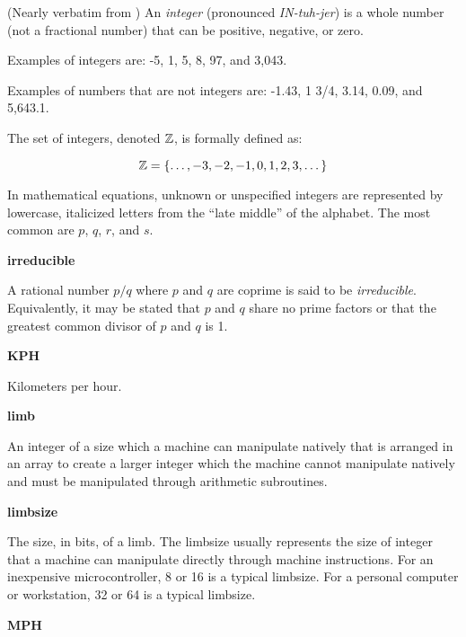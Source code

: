 \begin{vworktermglossaryenum}
      (Nearly verbatim from \cite{bibref:w:wwwwhatiscom}) An \emph{integer}
      (pronounced \emph{IN-tuh-jer}) is a whole number
      (not a fractional number) that can be positive, negative, or zero. 

      Examples of integers are: -5, 1, 5, 8, 97, and 3,043. 

      Examples of numbers that are not integers are: -1.43, 1 3/4, 3.14, 
      0.09, and 5,643.1. 

      The set of integers, denoted ${\mathbb{Z}}{}$, is formally defined as:

      \begin{equation}
      {\mathbb{Z}}{} = \{\ldots{}, -3, -2, -1, 0, 1, 2, 3, \ldots{} \}
      \end{equation}

      In mathematical equations, unknown or unspecified integers are 
      represented by lowercase, italicized letters from the 
      ``late middle'' of the alphabet.  The most common 
      are $p$, $q$, $r$, and $s$.

\item \textbf{irreducible}

      A rational number $p/q$ where $p$ and $q$ are coprime
      is said to be \emph{irreducible}.
      Equivalently, it may be stated that $p$ and $q$ share no prime factors
      or that the greatest common divisor of
      $p$ and $q$ is 1.

\item \textbf{KPH}

      Kilometers per hour.

\item \textbf{limb}

      An integer of a size which a machine can manipulate natively
      that is arranged in an array to create a larger
      integer which the machine cannot manipulate natively and must be
      manipulated through arithmetic subroutines.

\item \textbf{limbsize}

      The size, in bits, of a limb.  The limbsize usually represents
      the size of integer that a machine can manipulate directly
      through machine instructions.  For an inexpensive microcontroller,
      8 or 16 is a typical limbsize.  For a personal computer or 
      workstation, 32 or 64 is a typical limbsize.

\item \textbf{MPH}


\end{vworktermglossaryenum}
